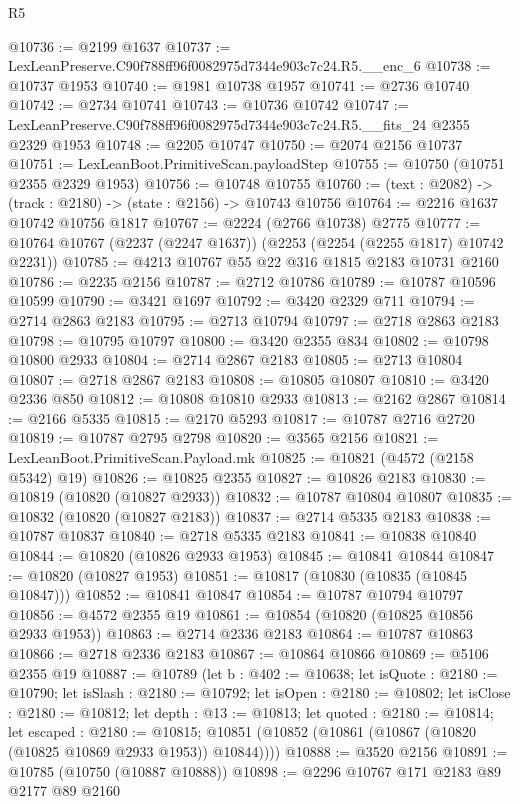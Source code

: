 \begin{lexlean}{R5}
\begin{coremodule}
@10736 := @2199 @1637
@10737 := LexLeanPreserve.C90f788ff96f0082975d7344e903c7c24.R5.__enc_6
@10738 := @10737 @1953
@10740 := @1981 @10738 @1957
@10741 := @2736 @10740
@10742 := @2734 @10741
@10743 := @10736 @10742
@10747 := LexLeanPreserve.C90f788ff96f0082975d7344e903c7c24.R5.__fits_24 @2355 @2329 @1953
@10748 := @2205 @10747
@10750 := @2074 @2156 @10737
@10751 := LexLeanBoot.PrimitiveScan.payloadStep
@10755 := @10750 (@10751 @2355 @2329 @1953)
@10756 := @10748 @10755
@10760 := (text : @2082) -> (track : @2180) -> (state : @2156) -> @10743 @10756
@10764 := @2216 @1637 @10742 @10756 @1817
@10767 := @2224 (@2766 @10738) @2775
@10777 := @10764 @10767 (@2237 (@2247 @1637)) (@2253 (@2254 (@2255 @1817) @10742 @2231))
@10785 := @4213 @10767 @55 @22 @316 @1815 @2183 @10731 @2160
@10786 := @2235 @2156
@10787 := @2712 @10786
@10789 := @10787 @10596 @10599
@10790 := @3421 @1697
@10792 := @3420 @2329 @711
@10794 := @2714 @2863 @2183
@10795 := @2713 @10794
@10797 := @2718 @2863 @2183
@10798 := @10795 @10797
@10800 := @3420 @2355 @834
@10802 := @10798 @10800 @2933
@10804 := @2714 @2867 @2183
@10805 := @2713 @10804
@10807 := @2718 @2867 @2183
@10808 := @10805 @10807
@10810 := @3420 @2336 @850
@10812 := @10808 @10810 @2933
@10813 := @2162 @2867
@10814 := @2166 @5335
@10815 := @2170 @5293
@10817 := @10787 @2716 @2720
@10819 := @10787 @2795 @2798
@10820 := @3565 @2156
@10821 := LexLeanBoot.PrimitiveScan.Payload.mk
@10825 := @10821 (@4572 (@2158 @5342) @19)
@10826 := @10825 @2355
@10827 := @10826 @2183
@10830 := @10819 (@10820 (@10827 @2933))
@10832 := @10787 @10804 @10807
@10835 := @10832 (@10820 (@10827 @2183))
@10837 := @2714 @5335 @2183
@10838 := @10787 @10837
@10840 := @2718 @5335 @2183
@10841 := @10838 @10840
@10844 := @10820 (@10826 @2933 @1953)
@10845 := @10841 @10844
@10847 := @10820 (@10827 @1953)
@10851 := @10817 (@10830 (@10835 (@10845 @10847)))
@10852 := @10841 @10847
@10854 := @10787 @10794 @10797
@10856 := @4572 @2355 @19
@10861 := @10854 (@10820 (@10825 @10856 @2933 @1953))
@10863 := @2714 @2336 @2183
@10864 := @10787 @10863
@10866 := @2718 @2336 @2183
@10867 := @10864 @10866
@10869 := @5106 @2355 @19
@10887 := @10789
    (let b : @402 := @10638;
    let isQuote : @2180 := @10790;
    let isSlash : @2180 := @10792;
    let isOpen : @2180 := @10802;
    let isClose : @2180 := @10812;
    let depth : @13 := @10813;
    let quoted : @2180 := @10814;
    let escaped : @2180 := @10815;
    @10851 (@10852 (@10861 (@10867 (@10820 (@10825 @10869 @2933 @1953)) @10844))))
@10888 := @3520 @2156
@10891 := @10785 (@10750 (@10887 @10888))
@10898 := @2296 @10767 @171 @2183 @89 @2177 @89 @2160

\end{coremodule}
\end{lexlean}
